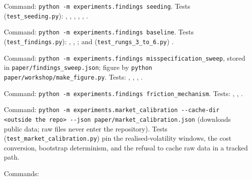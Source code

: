 \documentclass{article}
\begin{document}
{\raggedright
\begin{description}\small
\item[Tables~\ref{tab:mechanism} and~\ref{tab:consequence} (seeding).] Command:
  \texttt{python -m experiments.findings seeding}. Tests (\texttt{test\_seeding.py}):
  ,
  ,
  ,
  ,
  ,
  .
\item[Table~\ref{tab:band} (band rebalancing).] Command:
  \texttt{python -m experiments.findings baseline}. Tests (\texttt{test\_findings.py}):
  ,
  ,
  ; and
  (\texttt{test\_rungs\_3\_to\_6.py}) .
\item[Table~\ref{tab:sweep}, Figure~\ref{fig:friction}, Tables~\ref{tab:sweep-vol}--\ref{tab:sweep-cost} (friction sweep).]
  Command: \texttt{python -m experiments.findings misspecification\_sweep}, stored in
  \texttt{paper/findings\_sweep.json}; figure by \texttt{python paper/workshop/make\_figure.py}.
  Tests: ,
  ,
  ,
  .
\item[Table~\ref{tab:mechanism-full} (friction mechanism).] Command:
  \texttt{python -m experiments.findings friction\_mechanism}. Tests:
  ,
  ,
  .
\item[Table~\ref{tab:calibration} (market calibration).] Command:
  \texttt{python -m experiments.market\_calibration -{}-cache-dir <outside the repo>
  -{}-json paper/market\_calibration.json} (downloads public data; raw files never enter the
  repository). Tests (\texttt{test\_market\_calibration.py}) pin the realised-volatility windows,
  the cost conversion, bootstrap determinism, and the refusal to cache raw data in a tracked path.
\item[Section~\ref{sec:noise} (evaluation noise).] Commands:

\end{description}}
\end{document}
